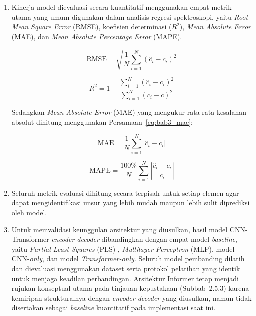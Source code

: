 \begin{enumerate}
    \item Kinerja model dievaluasi secara kuantitatif menggunakan empat metrik utama yang umum digunakan dalam analisis regresi spektroskopi, yaitu \textit{Root Mean Square Error} (RMSE), koefisien determinasi ($R^2$), \textit{Mean Absolute Error} (MAE), dan \textit{Mean Absolute Percentage Error} (MAPE).

\begin{equation} \label{eq:bab3_rmse}
\mathrm{RMSE} = \sqrt{\frac{1}{N}\sum_{i=1}^{N}\left(\hat{c}_i - c_i\right)^2}
\end{equation}

\begin{equation} \label{eq:bab3_r2}
R^2 = 1 - \frac{\sum_{i=1}^{N}(\hat{c}_i - c_i)^2}{\sum_{i=1}^{N}(c_i - \bar{c})^2}
\end{equation}

Sedangkan \textit{Mean Absolute Error} (MAE) yang mengukur rata-rata kesalahan absolut dihitung menggunakan Persamaan~\ref{eq:bab3_mae}:

\begin{equation} \label{eq:bab3_mae}
\mathrm{MAE} = \frac{1}{N}\sum_{i=1}^{N}\left|\hat{c}_i - c_i\right|
\end{equation}

\begin{equation} \label{eq:bab3_mape}
\mathrm{MAPE} = \frac{100\%}{N}\sum_{i=1}^{N}\left|\frac{\hat{c}_i - c_i}{c_i}\right|
\end{equation}

    \item Seluruh metrik evaluasi dihitung secara terpisah untuk setiap elemen agar dapat mengidentifikasi unsur yang lebih mudah maupun lebih sulit diprediksi oleh model.

    \item Untuk memvalidasi keunggulan arsitektur yang diusulkan, hasil model CNN-Transformer \textit{encoder-decoder} dibandingkan dengan empat model \textit{baseline}, yaitu \textit{Partial Least Squares} (PLS) \citep{wold_pls_2001}, \textit{Multilayer Perceptron} (MLP), model CNN-\textit{only}, dan model \textit{Transformer-only}. Seluruh model pembanding dilatih dan dievaluasi menggunakan dataset serta protokol pelatihan yang identik untuk menjaga keadilan perbandingan. Arsitektur Informer \citep{zhou_informer_2021, walidain_informer-based_2026} tetap menjadi rujukan konseptual utama pada tinjauan kepustakaan (Subbab~2.5.3) karena kemiripan strukturalnya dengan \textit{encoder-decoder} yang diusulkan, namun tidak disertakan sebagai \textit{baseline} kuantitatif pada implementasi saat ini.


\end{enumerate}
